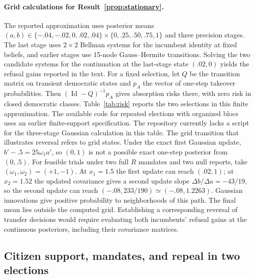 \documentclass[11pt,letterpaper]{article}
\newcommand{\Id}{\operatorname{Id}}
\begin{document}
\paragraph{Grid calculations for Result~\ref{prop:stationary}.}
The reported approximation uses posterior means $(a,b)\in\{-.04,-.02,0,.02,.04\}\times\{0,.25,.50,.75,1\}$ and three precision stages. The last stage uses $2\times2$ Bellman systems for the incumbent identity at fixed beliefs, and earlier stages use 15-node Gauss--Hermite transitions. Solving the two candidate systems for the continuation at the last-stage state $(.02,0)$ yields the refusal gains reported in the text. For a fixed selection, let $Q$ be the transition matrix on transient democratic states and $p_A$ the vector of one-step takeover probabilities. Then $(\Id-Q)^{-1}p_A$ gives absorption risks there, with zero risk in closed democratic classes. Table~\ref{tab:risk} reports the two selections in this finite approximation. The available code for repeated elections with organized blocs uses an earlier finite-support specification. The repository currently lacks a script for the three-stage Gaussian calculation in this table. The grid transition that illustrates reversal refers to grid states. Under the exact first Gaussian update, $b'-.5=25\omega_1 a'$, so $(0,1)$ is not a possible exact one-step posterior from $(0,.5)$. For feasible trials under two full $R$ mandates and two null reports, take $(\omega_1,\omega_2)=(+1,-1)$. At $x_1=1.5$ the first update can reach $(.02,1)$; at $x_2=1.52$ the updated covariance gives a second update slope $\Delta b/\Delta a=-43/19$, so the second update can reach $(-.08,233/190)\simeq(-.08,1.2263)$. Gaussian innovations give positive probability to neighborhoods of this path. The final mean lies outside the computed grid. Establishing a corresponding reversal of transfer decisions would require evaluating both incumbents' refusal gains at the continuous posteriors, including their covariance matrices.

\subsection{Citizen support, mandates, and repeal in two elections}\label{app:civicwork}
\end{document}
